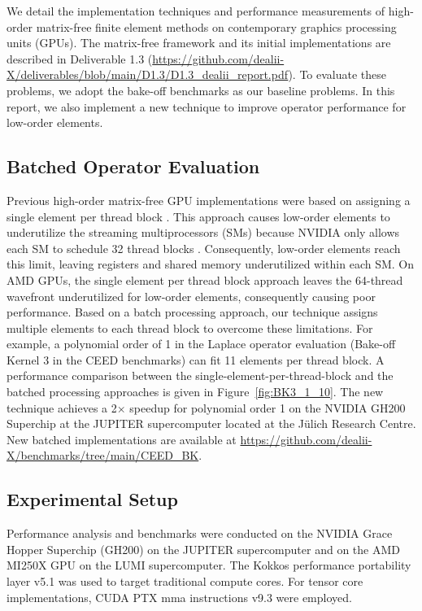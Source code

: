 \documentclass[a4paper,12pt]{article}
\begin{document}
We detail the implementation techniques and performance measurements of high-order matrix-free finite element methods on contemporary graphics processing units (GPUs).
The matrix-free framework and its initial implementations are described in Deliverable 1.3 (\url{https://github.com/dealii-X/deliverables/blob/main/D1.3/D1.3_dealii_report.pdf}).
To evaluate these problems, we adopt the bake-off benchmarks \cite{Fischer20scalability} as our baseline problems. In this report, we also implement a new technique to improve operator performance for low-order elements.

\subsection{Batched Operator Evaluation}

Previous high-order matrix-free GPU implementations were based on assigning a single element per thread block \citep{tens_prod}. This approach causes low-order elements to underutilize
the streaming multiprocessors (SMs) because NVIDIA only allows each SM to schedule 32 thread blocks \citep{nvidia_hopper_tuning}. Consequently, low-order elements reach this limit,
leaving registers and shared memory underutilized within each SM. On AMD GPUs, the single element per thread block approach leaves the 64-thread wavefront underutilized for low-order elements, consequently causing poor performance.
Based on a batch processing approach, our technique assigns multiple elements to each thread block to overcome these limitations. For example, a polynomial order of 1 in the Laplace operator evaluation (Bake-off Kernel 3 in the CEED benchmarks) can fit 11 elements per thread block.
A performance comparison between the single-element-per-thread-block and the batched processing approaches is given in Figure~\ref{fig:BK3_1_10}. The new technique achieves a 2$\times$ speedup for polynomial order 1 on the NVIDIA GH200 Superchip at the JUPITER supercomputer located at the Jülich Research Centre.
New batched implementations are available at \url{https://github.com/dealii-X/benchmarks/tree/main/CEED\_BK}.

\subsection{Experimental Setup}

Performance analysis and benchmarks were conducted on the NVIDIA Grace Hopper Superchip (GH200) on the JUPITER supercomputer and on the AMD MI250X GPU on the LUMI supercomputer. The Kokkos performance portability layer
v5.1 \citep{kokkos} was used to target traditional compute cores. For tensor core implementations, CUDA PTX mma instructions v9.3 \citep{nvidia_mma} were employed.
\end{document}
